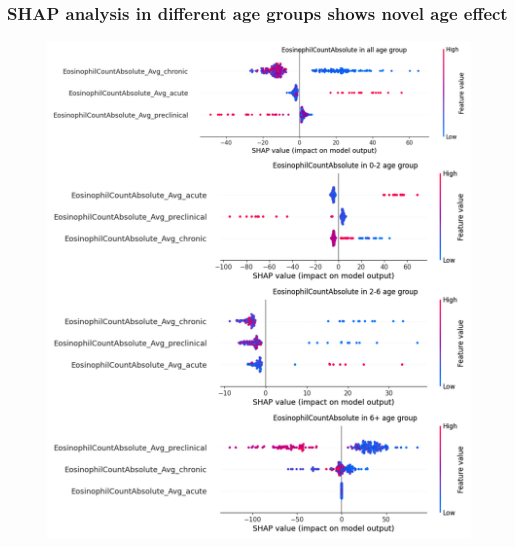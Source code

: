 \documentclass[final,1p,times,authoryear]{elsarticle}
\begin{document}
\subsubsection{SHAP analysis in different age groups shows novel age effect}
\begin{figure}[t]  
    \centering 
    \includegraphics[width=\textwidth]{figures/modelexplanation_age.png}
    \caption{}\label{modelexplanation_age}

\end{figure}
\end{document}
